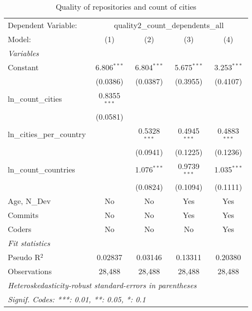 \begin{table}[htbp]
   \caption{Quality of repositories and count of cities}
   \centering
   \begin{tabular}{lcccc}
      \tabularnewline \midrule \midrule
      Dependent Variable: & \multicolumn{4}{c}{quality2\_count\_dependents\_all}\\
      Model:                      & (1)            & (2)            & (3)            & (4)\\  
      \midrule
      \emph{Variables}\\
      Constant                    & 6.806$^{***}$  & 6.804$^{***}$  & 5.675$^{***}$  & 3.253$^{***}$\\   
                                  & (0.0386)       & (0.0387)       & (0.3955)       & (0.4107)\\   
      ln\_count\_cities           & 0.8355$^{***}$ &                &                &   \\   
                                  & (0.0581)       &                &                &   \\   
      ln\_cities\_per\_country    &                & 0.5328$^{***}$ & 0.4945$^{***}$ & 0.4883$^{***}$\\   
                                  &                & (0.0941)       & (0.1225)       & (0.1236)\\   
      ln\_count\_countries        &                & 1.076$^{***}$  & 0.9739$^{***}$ & 1.035$^{***}$\\   
                                  &                & (0.0824)       & (0.1094)       & (0.1111)\\   
      Age, N\_Dev                 & No             & No             & Yes            & Yes\\  
      Commits                     & No             & No             & Yes            & Yes\\  
      Coders                      & No             & No             & No             & Yes\\  
      \midrule
      \emph{Fit statistics}\\
      Pseudo R$^2$                & 0.02837        & 0.03146        & 0.13311        & 0.20380\\  
      Observations                & 28,488         & 28,488         & 28,488         & 28,488\\  
      \midrule \midrule
      \multicolumn{5}{l}{\emph{Heteroskedasticity-robust standard-errors in parentheses}}\\
      \multicolumn{5}{l}{\emph{Signif. Codes: ***: 0.01, **: 0.05, *: 0.1}}\\
   \end{tabular}
\end{table}


